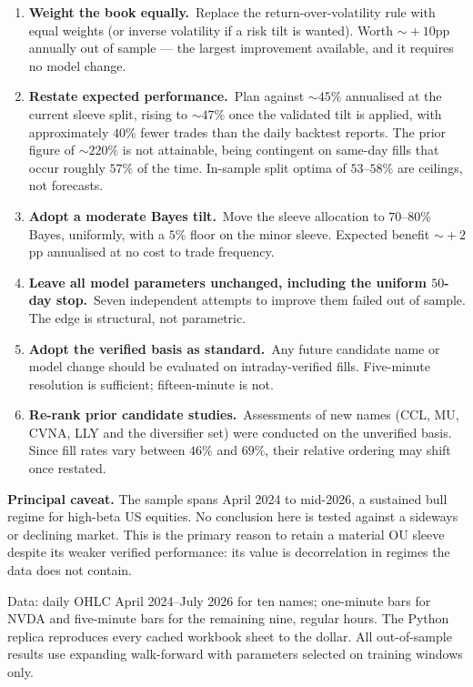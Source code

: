 \documentclass[11pt]{article}
\newcommand{\kpi}[2]{\textbf{#1}\,{\footnotesize\color{bcgrey}#2}}
\begin{document}
\begin{enumerate}[leftmargin=1.5em,itemsep=3pt]
  \item \kpi{Weight the book equally.}{} Replace the return-over-volatility rule with equal
        weights (or inverse volatility if a risk tilt is wanted). Worth $\sim\!+10$pp annually
        out of sample --- the largest improvement available, and it requires no model change.
  \item \kpi{Restate expected performance.}{} Plan against $\sim\!45\%$ annualised at the
        current sleeve split, rising to $\sim\!47\%$ once the validated tilt is applied, with
        approximately $40\%$ fewer trades than the daily backtest reports. The prior figure of
        $\sim\!220\%$ is not attainable, being contingent on same-day fills that occur roughly
        $57\%$ of the time. In-sample split optima of $53\text{--}58\%$ are ceilings, not
        forecasts.
  \item \kpi{Adopt a moderate Bayes tilt.}{} Move the sleeve allocation to $70\text{--}80\%$
        Bayes, uniformly, with a $5\%$ floor on the minor sleeve. Expected benefit
        $\sim\!+2$pp annualised at no cost to trade frequency.
  \item \kpi{Leave all model parameters unchanged, including the uniform $50$-day stop.}{}
        Seven independent attempts to improve them failed out of sample. The edge is structural,
        not parametric.
  \item \kpi{Adopt the verified basis as standard.}{} Any future candidate name or model change
        should be evaluated on intraday-verified fills. Five-minute resolution is sufficient;
        fifteen-minute is not.
  \item \kpi{Re-rank prior candidate studies.}{} Assessments of new names (CCL, MU, CVNA, LLY
        and the diversifier set) were conducted on the unverified basis. Since fill rates vary
        between $46\%$ and $69\%$, their relative ordering may shift once restated.
\end{enumerate}

\textbf{Principal caveat.} The sample spans April 2024 to mid-2026, a sustained bull regime for
high-beta US equities. No conclusion here is tested against a sideways or declining market.
This is the primary reason to retain a material OU sleeve despite its weaker verified
performance: its value is decorrelation in regimes the data does not contain.

\vfill
{\footnotesize\color{bcgrey} Data: daily OHLC April 2024--July 2026 for ten names; one-minute
bars for NVDA and five-minute bars for the remaining nine, regular hours. The Python replica
reproduces every cached workbook sheet to the dollar. All out-of-sample results use expanding
walk-forward with parameters selected on training windows only.}
\end{document}

